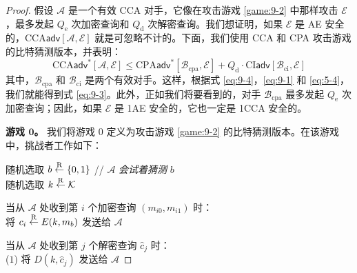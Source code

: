 \begin{proof}
假设 $\mathcal{A}$ 是一个有效 CCA 对手，它像在攻击游戏 \ref{game:9-2} 中那样攻击 $\mathcal{E}$，最多发起 $Q_\mathrm{e}$ 次加密查询和 $Q_\mathrm{d}$ 次解密查询。我们想证明，如果 $\mathcal{E}$ 是 AE 安全的，$\mathrm{CCA}\mathsf{adv}[\mathcal{A},\mathcal{E}]$ 就是可忽略不计的。下面，我们使用 CCA 和 CPA 攻击游戏的比特猜测版本，并表明：
\begin{equation}\label{eq:9-4}
\mathrm{CCA}\mathsf{adv}^*[\mathcal{A},\mathcal{E}]
\leq
\mathrm{CPA}\mathsf{adv}^*[\mathcal{B}_\mathrm{cpa},\mathcal{E}]+
Q_\mathrm{d}\cdot
\mathrm{CI}\mathsf{adv}[\mathcal{B}_\mathrm{ci},\mathcal{E}]
\end{equation}
其中，$\mathcal{B}_\mathrm{cpa}$ 和 $\mathcal{B}_\mathrm{ci}$ 是两个有效对手。这样，根据式 \ref{eq:9-4}，\ref{eq:9-1} 和 \ref{eq:5-4}，我们就能得到式 \ref{eq:9-3}。此外，正如我们将要看到的，对手 $\mathcal{B}_\mathrm{cpa}$ 最多发起 $Q_\mathrm{e}$ 次加密查询；因此，如果 $\mathcal{E}$ 是 1AE 安全的，它也一定是 1CCA 安全的。

\vspace*{5pt}

\noindent\textbf{游戏 $\mathbf{0}$。}
我们将游戏 $0$ 定义为攻击游戏 \ref{game:9-2} 的比特猜测版本。在该游戏中，挑战者工作如下：

\vspace*{10pt}

\hspace*{5pt} 随机选取 $b\overset{\rm R}\leftarrow\{0,1\}$
\hspace*{90pt} // \quad $\mathcal{A}$ \emph{会试着猜测} $b$\\
\hspace*{26pt} 随机选取 $k\overset{\rm R}\leftarrow\mathcal{K}$

\vspace*{5pt}

\hspace*{5pt} 当从 $\mathcal{A}$ 处收到第 $i$ 个加密查询 $(m_{i0},m_{i1})$ 时：\\
\hspace*{50pt} 将 $c_i\overset{\rm R}\leftarrow E(k,m_b)$ 发送给 $\mathcal{A}$

\vspace*{5pt}

\hspace*{5pt} 当从 $\mathcal{A}$ 处收到第 $j$ 个解密查询 $\hat{c}_j$ 时：\\
\hspace*{5pt} ($1$)
\hspace*{24.5pt} 将 $D(k,\hat{c}_j)$ 发送给 $\mathcal{A}$


\end{proof}
